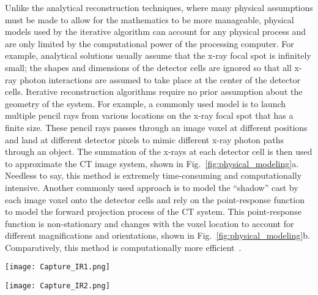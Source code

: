 Unlike the analytical reconstruction techniques, where many physical assumptions must be made to allow for the mathematics to be more manageable, physical models used by the iterative algorithm can account for any physical process and are only limited by the computational power of the processing computer.  For example, analytical solutions usually assume that the x-ray focal spot is infinitely small; the shapes and dimensions of the detector cells are ignored so that all x-ray photon interactions are assumed to take place at the center of the detector cells.  Iterative reconstruction algorithms require no prior assumption about the geometry of the system.  For example, a commonly used model is to launch multiple pencil rays from various locations on the x-ray focal spot that has a finite size.  These pencil rays passes through an image voxel at different positions and land at different detector pixels to mimic different x-ray photon paths through an object.  The summation of the x-rays at each detector cell is then used to approximate the CT image system, shown in Fig.~\ref{fig:physical_modeling}a. Needless to say, this method is extremely time-consuming and computationally intensive.  Another commonly used approach is to model the ``shadow'' cast by each image voxel onto the detector cells and rely on the point-response function to model the forward projection process of the CT system.  This point-response function is non-stationary and changes with the voxel location to account for different magnifications and orientations, shown in Fig.~\ref{fig:physical_modeling}b.  Comparatively, this method is computationally more efficient~\citep{Hsieh2013}.


\begin{figure*}
	\begin{minipage}{0.4\linewidth}
	\texttt{[image: Capture\_IR1.png]}
	\subcaption{}
	\end{minipage}
	\begin{minipage}{0.4\linewidth}
	\texttt{[image: Capture\_IR2.png]}
	\subcaption{}
	\end{minipage}
\caption[Common physical models used for the iterative reconstruction algorithm.]{Common physical models used for the iterative reconstruction algorithm\footnotemark. (a) The pencil beam model; and (b) the point-response model.}
\label{fig:physical_modeling}
\end{figure*}



